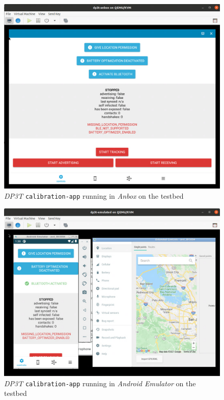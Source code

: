 \documentclass[
    author={Jacob Daniel Halsey},
    supervisor={Prof. Awais Rashid},
    degree={BSc},
    title={Building a Testbed for Evaluating Privacy Enhancing Technologies  (PETs)},
    subtitle={},
    type={software development},
    year={2021}
]{dissertation}
\begin{document}
\begin{figure}
	\centering
	\includegraphics[width=13.5cm]{img/anbox}
	\caption{\emph{DP3T} \texttt{calibration-app} running in \emph{Anbox} on the testbed}
	\label{fig:anbox}
\end{figure}

\begin{figure}
	\centering
	\includegraphics[width=13.5cm]{img/android_emulator}
	\caption{\emph{DP3T} \texttt{calibration-app} running in \emph{Android Emulator} on the testbed}
	\label{fig:anbox}
\end{figure}
\end{document}
